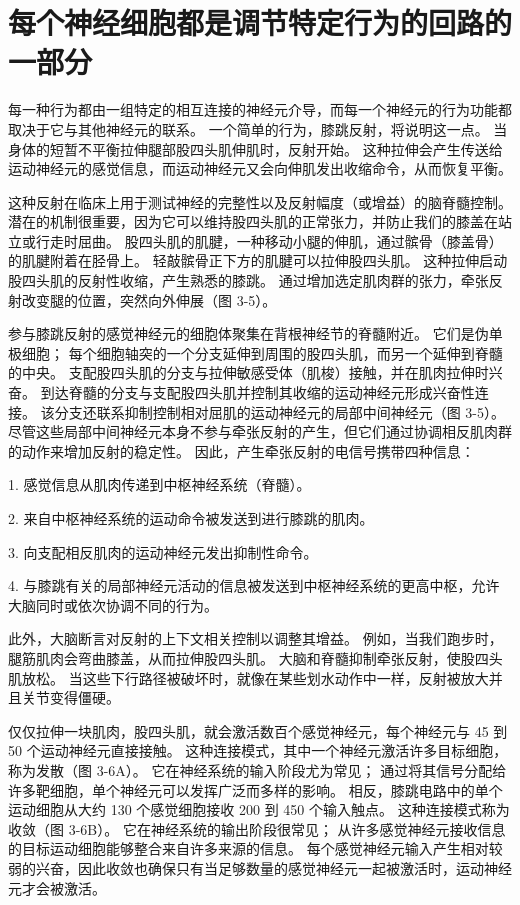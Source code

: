 \section{每个神经细胞都是调节特定行为的回路的一部分}
每一种行为都由一组特定的相互连接的神经元介导，而每一个神经元的行为功能都取决于它与其他神经元的联系。 一个简单的行为，膝跳反射，将说明这一点。 当身体的短暂不平衡拉伸腿部股四头肌伸肌时，反射开始。 这种拉伸会产生传送给运动神经元的感觉信息，而运动神经元又会向伸肌发出收缩命令，从而恢复平衡。

这种反射在临床上用于测试神经的完整性以及反射幅度（或增益）的脑脊髓控制。 潜在的机制很重要，因为它可以维持股四头肌的正常张力，并防止我们的膝盖在站立或行走时屈曲。 股四头肌的肌腱，一种移动小腿的伸肌，通过髌骨（膝盖骨）的肌腱附着在胫骨上。 轻敲髌骨正下方的肌腱可以拉伸股四头肌。 这种拉伸启动股四头肌的反射性收缩，产生熟悉的膝跳。 通过增加选定肌肉群的张力，牵张反射改变腿的位置，突然向外伸展（图 3-5）。

参与膝跳反射的感觉神经元的细胞体聚集在背根神经节的脊髓附近。 它们是伪单极细胞； 每个细胞轴突的一个分支延伸到周围的股四头肌，而另一个延伸到脊髓的中央。 支配股四头肌的分支与拉伸敏感受体（肌梭）接触，并在肌肉拉伸时兴奋。 到达脊髓的分支与支配股四头肌并控制其收缩的运动神经元形成兴奋性连接。 该分支还联系抑制控制相对屈肌的运动神经元的局部中间神经元（图 3-5）。 尽管这些局部中间神经元本身不参与牵张反射的产生，但它们通过协调相反肌肉群的动作来增加反射的稳定性。 因此，产生牵张反射的电信号携带四种信息：

1. 感觉信息从肌肉传递到中枢神经系统（脊髓）。

2. 来自中枢神经系统的运动命令被发送到进行膝跳的肌肉。

3. 向支配相反肌肉的运动神经元发出抑制性命令。

4. 与膝跳有关的局部神经元活动的信息被发送到中枢神经系统的更高中枢，允许大脑同时或依次协调不同的行为。

此外，大脑断言对反射的上下文相关控制以调整其增益。 例如，当我们跑步时，腿筋肌肉会弯曲膝盖，从而拉伸股四头肌。 大脑和脊髓抑制牵张反射，使股四头肌放松。 当这些下行路径被破坏时，就像在某些划水动作中一样，反射被放大并且关节变得僵硬。

仅仅拉伸一块肌肉，股四头肌，就会激活数百个感觉神经元，每个神经元与 45 到 50 个运动神经元直接接触。 这种连接模式，其中一个神经元激活许多目标细胞，称为发散（图 3-6A）。 它在神经系统的输入阶段尤为常见； 通过将其信号分配给许多靶细胞，单个神经元可以发挥广泛而多样的影响。 相反，膝跳电路中的单个运动细胞从大约 130 个感觉细胞接收 200 到 450 个输入触点。 这种连接模式称为收敛（图 3-6B）。 它在神经系统的输出阶段很常见； 从许多感觉神经元接收信息的目标运动细胞能够整合来自许多来源的信息。 每个感觉神经元输入产生相对较弱的兴奋，因此收敛也确保只有当足够数量的感觉神经元一起被激活时，运动神经元才会被激活。

